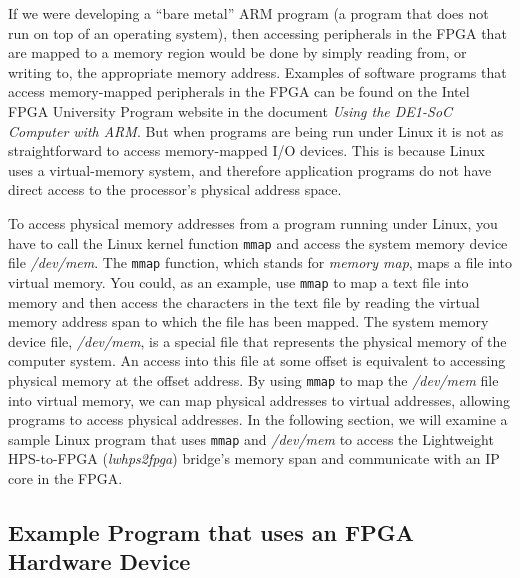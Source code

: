 \documentclass[11pt, twoside, pdftex]{article}
\begin{document}
If we were developing a ``bare metal'' ARM program (a program that does not run on top of an 
operating system), then accessing peripherals in the FPGA that are mapped to a memory region
would be done by simply reading from, or writing to, the appropriate memory address. Examples 
of software programs that access memory-mapped peripherals in the FPGA can be found on the 
Intel FPGA University Program website in the document {\it Using the DE1-SoC Computer with ARM}. 
But when programs are being run under Linux it is not as straightforward to access 
memory-mapped I/O devices. This is because Linux uses a virtual-memory system, and therefore 
application programs do not have direct access to the processor's physical address space. 

To access physical memory addresses from a program running under Linux, you have to call the
Linux kernel function \texttt{mmap} and access the system memory device file \textit{/dev/mem}. 
The \texttt{mmap} function, which stands for {\it memory map},
maps a file into virtual memory. You could, as an example, use \texttt{mmap} to map a text file 
into memory and then access the characters in the text file by reading the virtual memory address 
span to which the file has been mapped. The system memory device file, \textit{/dev/mem}, is 
a special file that represents the physical memory of the computer system. An access into
this file at some offset is equivalent to accessing physical memory at the offset address. By 
using \texttt{mmap} to map the \textit{/dev/mem} file into virtual memory, we can map 
physical addresses to virtual addresses, allowing programs to access physical addresses. 
In the following section, we will examine a sample Linux program that uses \texttt{mmap} 
and \textit{/dev/mem} to access the Lightweight HPS-to-FPGA ({\it lwhps2fpga}) bridge's
memory span and communicate with an IP core in the FPGA.

\subsection{Example Program that uses an FPGA Hardware Device}
\label{sec:program_with_fpga_communication}
\end{document}
